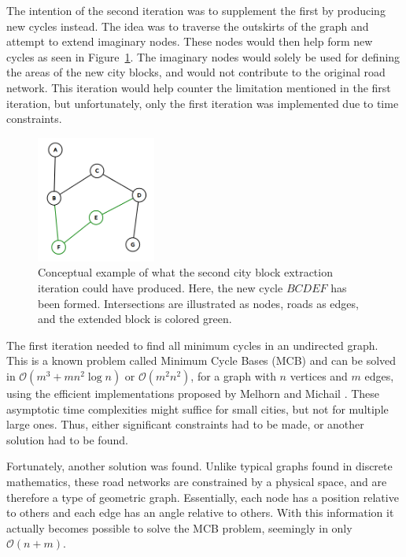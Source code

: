 The intention of the second iteration was to supplement the first by producing new cycles instead.
The idea was to traverse the outskirts of the graph and attempt to extend imaginary nodes.
These nodes would then help form new cycles as seen in Figure~\ref{fig:extend_block}.
The imaginary nodes would solely be used for defining the areas of the new city blocks, and would not contribute to the original road network.
This iteration would help counter the limitation mentioned in the first iteration, but unfortunately, only the first iteration was implemented due to time constraints.

\begin{figure}[h!]
  \centering
  \includegraphics[width=0.35\textwidth]{figure/extend_block.png}

  \caption{Conceptual example of what the second city block extraction iteration could have produced. Here, the new cycle $BCDEF$ has been formed. Intersections are illustrated as nodes, roads as edges, and the extended block is colored green.}
  \label{fig:extend_block}
\end{figure}

The first iteration needed to find all minimum cycles in an undirected graph.
This is a known problem called Minimum Cycle Bases (MCB) and can be solved in $\mathcal{O}(m^3 + mn^2 \log n)$ or $\mathcal{O}(m^2n^2)$, for a graph with $n$ vertices and $m$ edges, using the efficient implementations proposed by Melhorn and Michail \cite{mcb_paper}.
These asymptotic time complexities might suffice for small cities, but not for multiple large ones.
Thus, either significant constraints had to be made, or another solution had to be found.

Fortunately, another solution was found.
Unlike typical graphs found in discrete mathematics, these road networks are constrained by a physical space, and are therefore a type of geometric graph.
Essentially, each node has a position relative to others and each edge has an angle relative to others.
With this information it actually becomes possible to solve the MCB problem, seemingly in only $\mathcal{O}(n + m)$.

